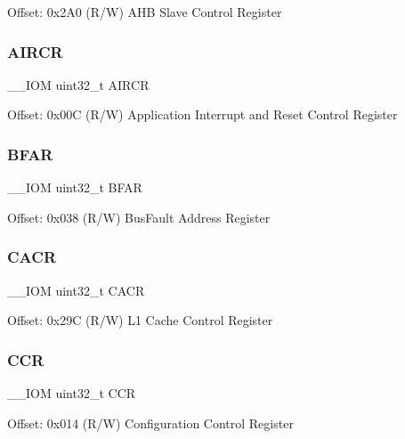 Offset\+: 0x2\+A0 (R/W) A\+HB Slave Control Register \mbox{\label{struct_s_c_b___type_a9b6ccd9c0c0865f8facad77ea37240b0}} 
\subsubsection{\texorpdfstring{AIRCR}{AIRCR}}
{\footnotesize\ttfamily \+\_\+\+\_\+\+I\+OM uint32\+\_\+t A\+I\+R\+CR}

Offset\+: 0x00C (R/W) Application Interrupt and Reset Control Register \mbox{\label{struct_s_c_b___type_a3fde073744418e2fe476333cb4d55d0d}} 
\subsubsection{\texorpdfstring{BFAR}{BFAR}}
{\footnotesize\ttfamily \+\_\+\+\_\+\+I\+OM uint32\+\_\+t B\+F\+AR}

Offset\+: 0x038 (R/W) Bus\+Fault Address Register \mbox{\label{struct_s_c_b___type_a39711bf09810b078ac81b2c76c6908f6}} 
\subsubsection{\texorpdfstring{CACR}{CACR}}
{\footnotesize\ttfamily \+\_\+\+\_\+\+I\+OM uint32\+\_\+t C\+A\+CR}

Offset\+: 0x29C (R/W) L1 Cache Control Register \mbox{\label{struct_s_c_b___type_ad68b5c1f2d9845ef4247cf2d9b041336}} 
\subsubsection{\texorpdfstring{CCR}{CCR}}
{\footnotesize\ttfamily \+\_\+\+\_\+\+I\+OM uint32\+\_\+t C\+CR}

Offset\+: 0x014 (R/W) Configuration Control Register \mbox{\label{struct_s_c_b___type_a90c793639fc9470e50e4f4fc4b3464da}} 
